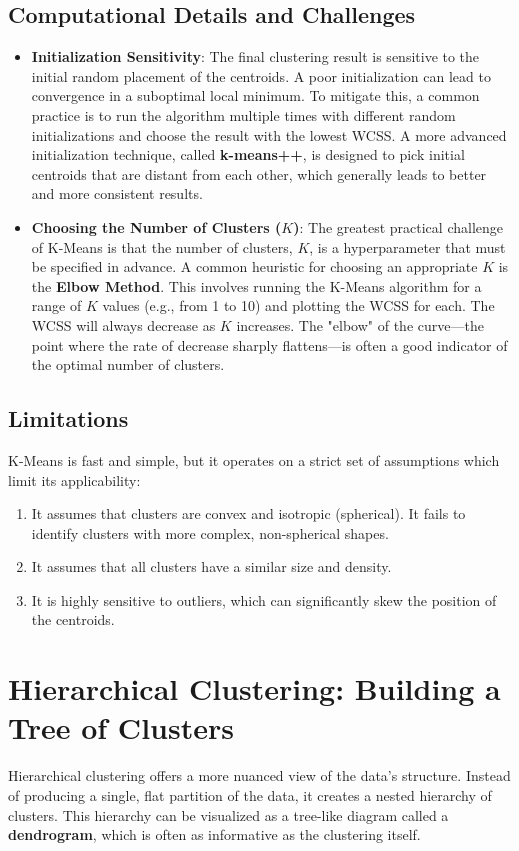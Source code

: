 \subsection*{Computational Details and Challenges}
\begin{itemize}
    \item \textbf{Initialization Sensitivity}: The final clustering result is sensitive to the initial random placement of the centroids. A poor initialization can lead to convergence in a suboptimal local minimum. To mitigate this, a common practice is to run the algorithm multiple times with different random initializations and choose the result with the lowest WCSS. A more advanced initialization technique, called \textbf{k-means++}, is designed to pick initial centroids that are distant from each other, which generally leads to better and more consistent results.
    
    \item \textbf{Choosing the Number of Clusters ($K$)}: The greatest practical challenge of K-Means is that the number of clusters, $K$, is a hyperparameter that must be specified in advance. A common heuristic for choosing an appropriate $K$ is the \textbf{Elbow Method}. This involves running the K-Means algorithm for a range of $K$ values (e.g., from 1 to 10) and plotting the WCSS for each. The WCSS will always decrease as $K$ increases. The "elbow" of the curve—the point where the rate of decrease sharply flattens—is often a good indicator of the optimal number of clusters.
\end{itemize}

\subsection*{Limitations}
K-Means is fast and simple, but it operates on a strict set of assumptions which limit its applicability:
\begin{enumerate}
    \item It assumes that clusters are convex and isotropic (spherical). It fails to identify clusters with more complex, non-spherical shapes.
    \item It assumes that all clusters have a similar size and density.
    \item It is highly sensitive to outliers, which can significantly skew the position of the centroids.
\end{enumerate}

\section{Hierarchical Clustering: Building a Tree of Clusters}
\label{sec:hierarchical_clustering}
Hierarchical clustering offers a more nuanced view of the data's structure. Instead of producing a single, flat partition of the data, it creates a nested hierarchy of clusters. This hierarchy can be visualized as a tree-like diagram called a \textbf{dendrogram}, which is often as informative as the clustering itself.

